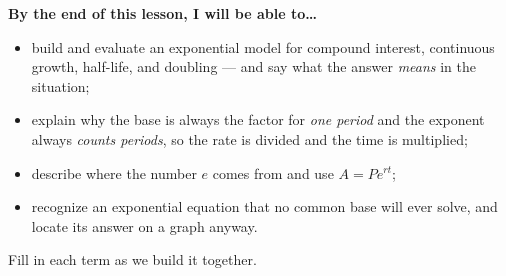 \documentclass[10pt]{article}
\begin{document}
\namedateperiod

\vspace{0.08in}

\begin{objectivebox}
\textbf{By the end of this lesson, I will be able to\dots}
\begin{itemize}\setlength{\itemsep}{2pt}
  \item build and evaluate an exponential model for compound interest, continuous growth, half-life, and doubling --- and say what the answer \emph{means} in the situation;
  \item explain why the base is always the factor for \emph{one period} and the exponent always \emph{counts periods}, so the rate is divided and the time is multiplied;
  \item describe where the number $e$ comes from and use $A=Pe^{rt}$;
  \item recognize an exponential equation that no common base will ever solve, and locate its answer on a graph anyway.
\end{itemize}
\end{objectivebox}

\vspace{0.05in}

\begin{vocabbox}
\small
Fill in each term as we build it together.
\par\vspace{2pt}   %
\end{vocabbox}
\end{document}
